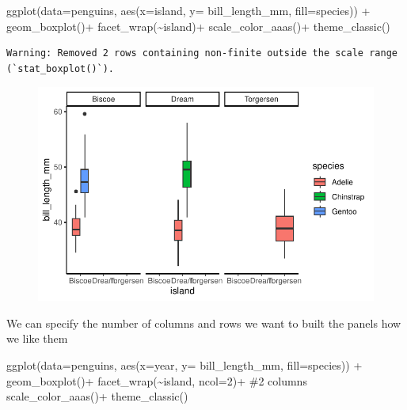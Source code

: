 \documentclass[
  letterpaper,
  DIV=11,
  numbers=noendperiod]{scrartcl}
\newenvironment{Shaded}{\begin{snugshade}}{\end{snugshade}}
\newcommand{\AttributeTok}[1]{\textcolor[rgb]{0.40,0.45,0.13}{#1}}
\newcommand{\CommentTok}[1]{\textcolor[rgb]{0.37,0.37,0.37}{#1}}
\newcommand{\DecValTok}[1]{\textcolor[rgb]{0.68,0.00,0.00}{#1}}
\newcommand{\FunctionTok}[1]{\textcolor[rgb]{0.28,0.35,0.67}{#1}}
\newcommand{\NormalTok}[1]{\textcolor[rgb]{0.00,0.23,0.31}{#1}}
\newcommand{\SpecialCharTok}[1]{\textcolor[rgb]{0.37,0.37,0.37}{#1}}
\begin{document}
\begin{Shaded}
\begin{Highlighting}[]
\FunctionTok{ggplot}\NormalTok{(}\AttributeTok{data=}\NormalTok{penguins, }\FunctionTok{aes}\NormalTok{(}\AttributeTok{x=}\NormalTok{island, }\AttributeTok{y=}\NormalTok{ bill\_length\_mm, }\AttributeTok{fill=}\NormalTok{species)) }\SpecialCharTok{+}
  \FunctionTok{geom\_boxplot}\NormalTok{()}\SpecialCharTok{+}
  \FunctionTok{facet\_wrap}\NormalTok{(}\SpecialCharTok{\textasciitilde{}}\NormalTok{island)}\SpecialCharTok{+}
  \FunctionTok{scale\_color\_aaas}\NormalTok{()}\SpecialCharTok{+}
  \FunctionTok{theme\_classic}\NormalTok{()}
\end{Highlighting}
\end{Shaded}

\begin{verbatim}
Warning: Removed 2 rows containing non-finite outside the scale range
(`stat_boxplot()`).
\end{verbatim}

\begin{figure}[H]

{\centering \includegraphics{Lab_2_files/figure-pdf/unnamed-chunk-33-1.pdf}

}

\end{figure}

We can specify the number of columns and rows we want to built the
panels how we like them

\begin{Shaded}
\begin{Highlighting}[]
\FunctionTok{ggplot}\NormalTok{(}\AttributeTok{data=}\NormalTok{penguins, }\FunctionTok{aes}\NormalTok{(}\AttributeTok{x=}\NormalTok{year, }\AttributeTok{y=}\NormalTok{ bill\_length\_mm, }\AttributeTok{fill=}\NormalTok{species)) }\SpecialCharTok{+}
  \FunctionTok{geom\_boxplot}\NormalTok{()}\SpecialCharTok{+}
  \FunctionTok{facet\_wrap}\NormalTok{(}\SpecialCharTok{\textasciitilde{}}\NormalTok{island, }\AttributeTok{ncol=}\DecValTok{2}\NormalTok{)}\SpecialCharTok{+} \CommentTok{\#2 columns }
  \FunctionTok{scale\_color\_aaas}\NormalTok{()}\SpecialCharTok{+}
  \FunctionTok{theme\_classic}\NormalTok{()}
\end{Highlighting}
\end{Shaded}
\end{document}

